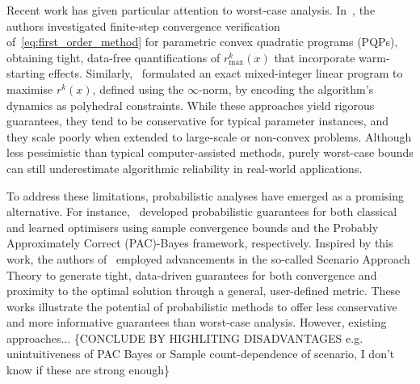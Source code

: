 Recent work has given particular attention to worst-case analysis. In~\cite{VRBS25}, the authors investigated finite-step convergence verification of~\eqref{eq:first_order_method} for parametric convex quadratic programs (PQPs), obtaining tight, data-free quantifications of $r^k_{\max}(x)$ that incorporate warm-starting effects. Similarly,~\cite{VRBS+24} formulated an exact mixed-integer linear program to maximise $r^k(x)$, defined using the $\infty$-norm, by encoding the algorithm’s dynamics as polyhedral constraints. While these approaches yield rigorous guarantees, they tend to be conservative for typical parameter instances, and they scale poorly when extended to large-scale or non-convex problems. Although less pessimistic than typical computer-assisted methods, purely worst-case bounds can still underestimate algorithmic reliability in real-world applications.  

To address these limitations, probabilistic analyses have emerged as a promising alternative. For instance,~\cite{RSBS25} developed probabilistic guarantees for both classical and learned optimisers using sample convergence bounds and the Probably Approximately Correct (PAC)-Bayes framework, respectively. Inspired by this work, the authors of~\cite{JHKM+25} employed advancements in the so-called Scenario Approach Theory to generate tight, data-driven guarantees for both convergence and proximity to the optimal solution through a general, user-defined metric. These works illustrate the potential of probabilistic methods to offer less conservative and more informative guarantees than worst-case analysis. However, existing approaches... \{CONCLUDE BY HIGHLITING DISADVANTAGES e.g. unintuitiveness of PAC Bayes or Sample count-dependence of scenario, I don't know if these are strong enough\}